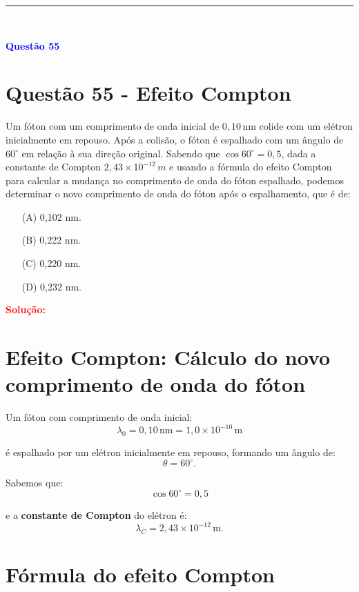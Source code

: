 \documentclass[a4paper,12pt]{article}
\begin{document}
\noindent\rule{\linewidth}{0.6pt}\\

\begin{flushleft}
\textbf{\textcolor{blue}{\Large Quest\~ao 55}}\\
\noindent
\section{Quest\~ao 55 - Efeito Compton}
Um fóton com um comprimento de onda inicial de \(0,10\,\text{nm}\) colide com um elétron inicialmente em repouso.  
Após a colisão, o fóton é espalhado com um ângulo de \(60^\circ\) em relação à sua direção original.  
Sabendo que \(\cos 60^\circ = 0,5\), dada a constante de Compton \(2,43 \times 10^{-12}\,m\) e usando a fórmula do 
efeito Compton para calcular a mudança no comprimento de onda do fóton espalhado, podemos determinar o novo comprimento 
de onda do fóton após o espalhamento, que é de:


\begin{itemize}
\item[(A)] 0{,}102 nm.
\item[(B)] 0{,}222 nm.
\item[(C)] 0{,}220 nm.
\item[(D)] 0{,}232 nm.
\end{itemize}

\vspace{0.5cm}

\textcolor{red}{\textbf{Solução:}}\\

\section*{Efeito Compton: Cálculo do novo comprimento de onda do fóton}

Um fóton com comprimento de onda inicial:
\[
\lambda_0 = 0{,}10\,\mathrm{nm} = 1{,}0 \times 10^{-10}\,\mathrm{m}
\]

é espalhado por um elétron inicialmente em repouso, formando um ângulo de:
\[
\theta = 60^\circ.
\]

Sabemos que:
\[
\cos 60^\circ = 0{,}5
\]

e a \textbf{constante de Compton} do elétron é:
\[
\lambda_C = 2{,}43 \times 10^{-12}\,\mathrm{m}.
\]

\section*{Fórmula do efeito Compton}


\end{flushleft}
\end{document}
